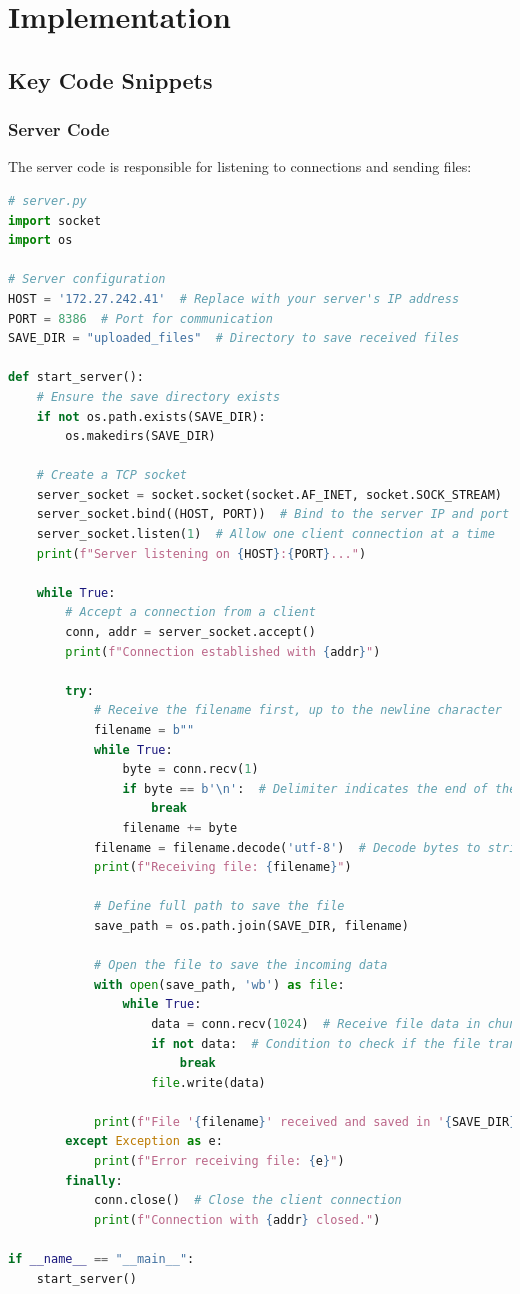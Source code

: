 \documentclass{article}
\begin{document}
\section{Implementation}
\subsection{Key Code Snippets}
\subsubsection{Server Code}
The server code is responsible for listening to connections and sending files:
\begin{lstlisting}[language=Python, caption=Server Code]
# server.py
import socket
import os

# Server configuration
HOST = '172.27.242.41'  # Replace with your server's IP address
PORT = 8386  # Port for communication
SAVE_DIR = "uploaded_files"  # Directory to save received files

def start_server():
    # Ensure the save directory exists
    if not os.path.exists(SAVE_DIR):
        os.makedirs(SAVE_DIR)

    # Create a TCP socket
    server_socket = socket.socket(socket.AF_INET, socket.SOCK_STREAM)
    server_socket.bind((HOST, PORT))  # Bind to the server IP and port
    server_socket.listen(1)  # Allow one client connection at a time
    print(f"Server listening on {HOST}:{PORT}...")

    while True:
        # Accept a connection from a client
        conn, addr = server_socket.accept()
        print(f"Connection established with {addr}")

        try:
            # Receive the filename first, up to the newline character
            filename = b""
            while True:
                byte = conn.recv(1)
                if byte == b'\n':  # Delimiter indicates the end of the filename
                    break
                filename += byte
            filename = filename.decode('utf-8')  # Decode bytes to string
            print(f"Receiving file: {filename}")

            # Define full path to save the file
            save_path = os.path.join(SAVE_DIR, filename)

            # Open the file to save the incoming data
            with open(save_path, 'wb') as file:
                while True:
                    data = conn.recv(1024)  # Receive file data in chunks (1KB)
                    if not data:  # Condition to check if the file transfer is complete
                        break
                    file.write(data)

            print(f"File '{filename}' received and saved in '{SAVE_DIR}/'.")
        except Exception as e:
            print(f"Error receiving file: {e}")
        finally:
            conn.close()  # Close the client connection
            print(f"Connection with {addr} closed.")

if __name__ == "__main__":
    start_server()

\end{lstlisting}
\end{document}

